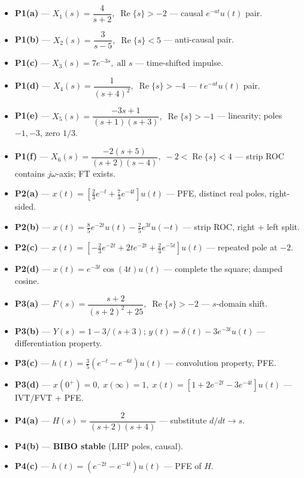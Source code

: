 \documentclass[11pt]{article}
\newcommand{\Real}{\operatorname{Re}}
\begin{document}
\begin{itemize}[leftmargin=*, nosep]
  \item \textbf{P1(a)} --- $\boxed{X_1(s) = \dfrac{4}{s+2},\; \Real\{s\}>-2}$ --- causal $e^{-at}u(t)$ pair.
  \item \textbf{P1(b)} --- $\boxed{X_2(s) = \dfrac{3}{s-5},\; \Real\{s\}<5}$ --- anti-causal pair.
  \item \textbf{P1(c)} --- $\boxed{X_3(s) = 7e^{-3s},\; \text{all } s}$ --- time-shifted impulse.
  \item \textbf{P1(d)} --- $\boxed{X_4(s) = \dfrac{1}{(s+4)^2},\; \Real\{s\}>-4}$ --- $t\,e^{-at}u(t)$ pair.
  \item \textbf{P1(e)} --- $\boxed{X_5(s) = \dfrac{-3s+1}{(s+1)(s+3)},\; \Real\{s\}>-1}$ --- linearity; poles $-1,-3$, zero $1/3$.
  \item \textbf{P1(f)} --- $\boxed{X_6(s) = \dfrac{-2(s+5)}{(s+2)(s-4)},\; -2<\Real\{s\}<4}$ --- strip ROC contains $j\omega$-axis; FT exists.
  \item \textbf{P2(a)} --- $\boxed{x(t) = [\tfrac{2}{3}e^{-t} + \tfrac{7}{3}e^{-4t}]u(t)}$ --- PFE, distinct real poles, right-sided.
  \item \textbf{P2(b)} --- $\boxed{x(t) = \tfrac{8}{5}e^{-2t}u(t) - \tfrac{2}{5}e^{3t}u(-t)}$ --- strip ROC, right + left split.
  \item \textbf{P2(c)} --- $\boxed{x(t) = [-\tfrac{2}{3}e^{-2t} + 2te^{-2t} + \tfrac{2}{3}e^{-5t}]u(t)}$ --- repeated pole at $-2$.
  \item \textbf{P2(d)} --- $\boxed{x(t) = e^{-3t}\cos(4t)u(t)}$ --- complete the square; damped cosine.
  \item \textbf{P3(a)} --- $\boxed{F(s) = \dfrac{s+2}{(s+2)^2+25},\; \Real\{s\}>-2}$ --- $s$-domain shift.
  \item \textbf{P3(b)} --- $\boxed{Y(s) = 1 - 3/(s+3)}$; $y(t)=\delta(t)-3e^{-3t}u(t)$ --- differentiation property.
  \item \textbf{P3(c)} --- $\boxed{h(t) = \tfrac{3}{5}(e^{-t}-e^{-6t})u(t)}$ --- convolution property, PFE.
  \item \textbf{P3(d)} --- $\boxed{x(0^+)=0,\; x(\infty)=1,\; x(t)=[1+2e^{-2t}-3e^{-4t}]u(t)}$ --- IVT/FVT + PFE.
  \item \textbf{P4(a)} --- $\boxed{H(s) = \dfrac{2}{(s+2)(s+4)}}$ --- substitute $d/dt\!\to\!s$.
  \item \textbf{P4(b)} --- \textbf{BIBO stable} (LHP poles, causal).
  \item \textbf{P4(c)} --- $\boxed{h(t) = (e^{-2t}-e^{-4t})u(t)}$ --- PFE of $H$.

\end{itemize}
\end{document}
